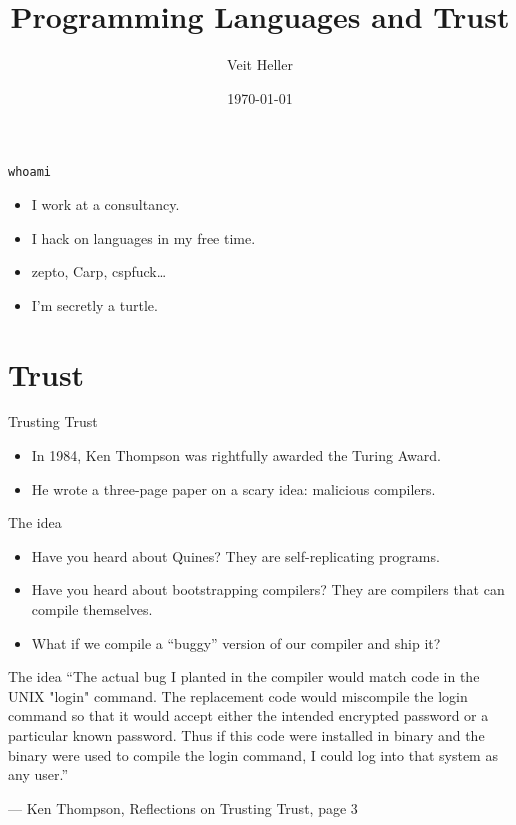 \documentclass[aspectratio=169]{beamer}
\title{Programming Languages and Trust}
\date{\today}
\author{Veit Heller}
\institute{Datengarten | CCCB}
\begin{document}
  \maketitle
  \begin{frame}{\texttt{whoami}}
    \begin{itemize}
      \item I work at a consultancy.
      \item I hack on languages in my free time.
      \item zepto, Carp, cspfuck\ldots
      \item I’m secretly a turtle.
    \end{itemize}
  \end{frame}
  \section{Trust}
  \begin{frame}{Trusting Trust}
    \begin{itemize}
      \item In 1984, Ken Thompson was rightfully awarded the Turing Award.
      \item He wrote a three-page paper on a scary idea: malicious compilers.
    \end{itemize}
  \end{frame}
  \begin{frame}{The idea}
    \begin{itemize}
      \item Have you heard about Quines? They are self-replicating programs.
      \item Have you heard about bootstrapping compilers? They are compilers
            that can compile themselves.
      \item What if we compile a “buggy” version of our compiler and ship it?
    \end{itemize}
  \end{frame}
  \begin{frame}{The idea}
    “The actual bug I planted in the compiler would match code in the UNIX
     "login" command.  The replacement code would miscompile the login
     command so that it would accept either the intended encrypted password
     or a particular known password. Thus if this code were installed in
     binary and the binary were used to compile the login command, I could
     log into that system as any user.”

     \indent — Ken Thompson, Reflections on Trusting Trust, page 3
  \end{frame}
\end{document}
